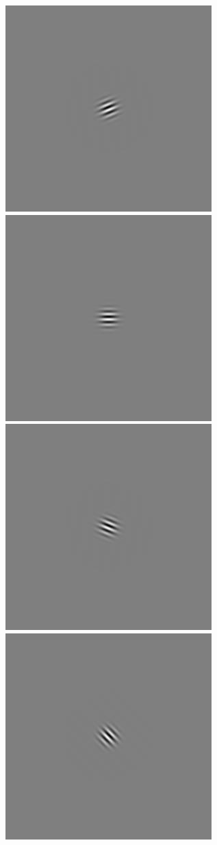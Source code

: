 \begin{figure}
\begin{center}
 \includegraphics[scale=0.1]{ch4/figures/iGabor1_3.jpg}
 \includegraphics[scale=0.1]{ch4/figures/iGabor1_4.jpg}
 \includegraphics[scale=0.1]{ch4/figures/iGabor1_5.jpg}
 \includegraphics[scale=0.1]{ch4/figures/iGabor1_6.jpg}

\end{center}
\end{figure}
